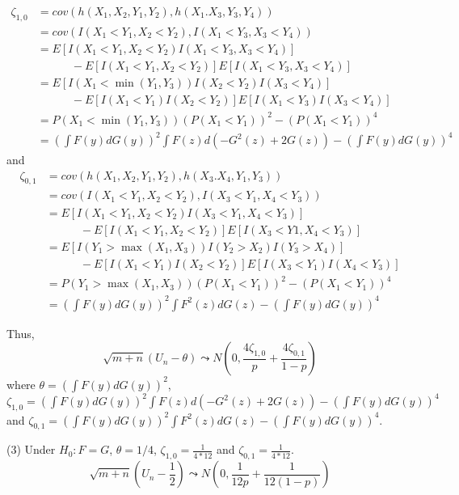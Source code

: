 \begin{solution}
\begin{equation*}
    \begin{split}
        \zeta_{1,0} & = cov(h(X_1, X_2, Y_1, Y_2), h(X_1. X_3, Y_3, Y_4)) \\
        & = cov(I(X_1<Y_1, X_2<Y_2), I(X_1<Y_3, X_3<Y_4)) \\
        & = E[I(X_1<Y_1, X_2<Y_2)I(X_1<Y_3, X_3<Y_4)] \\ 
        & \quad \quad \quad - E[I(X_1<Y_1, X_2<Y_2)] E[I(X_1<Y_3, X_3<Y_4)] \\
        & = E[I(X_1< \min(Y_1, Y_3)) I(X_2<Y_2) I(X_3 < Y_4) ] \\
        & \quad \quad \quad - E[I(X_1<Y_1) I(X_2<Y_2)] E[I(X_1<Y_3) I(X_3<Y_4)] \\
        & = P(X_1< \min(Y_1, Y_3))(P(X_1<Y_1))^2 - (P(X_1<Y_1))^4  \\
        & = \left(\int F(y) d G(y) \right)^2 \int F(z) d(-G^2(z)+2G(z)) - \left(\int F(y) d G(y) \right)^4
    \end{split}
\end{equation*}
and 
\begin{equation*}
    \begin{split}
        \zeta_{0,1} & = cov(h(X_1, X_2, Y_1, Y_2), h(X_3. X_4, Y_1, Y_3)) \\
        & = cov(I(X_1<Y_1, X_2<Y_2), I(X_3<Y_1, X_4<Y_3)) \\
        & = E[I(X_1<Y_1, X_2<Y_2)I(X_3<Y_1, X_4<Y_3)] \\ 
        & \quad \quad \quad - E[I(X_1<Y_1, X_2<Y_2)] E[I(X_3<Y1, X_4<Y_3)] \\
        & = E[I(Y_1 > \max(X_1, X_3)) I(Y_2 > X_2) I(Y_3 > X_4)] \\
        & \quad \quad \quad - E[I(X_1<Y_1) I(X_2<Y_2)] E[I(X_3<Y_1) I(X_4<Y_3)] \\
        & = P(Y_1 > \max(X_1, X_3))(P(X_1<Y_1))^2 - (P(X_1<Y_1))^4  \\
        & = \left(\int F(y) d G(y) \right)^2 \int F^2(z) dG(z) - \left(\int F(y) d G(y) \right)^4
    \end{split}
\end{equation*}

Thus,
\begin{equation*}
    \sqrt{m+n}(U_n-\theta) \leadsto N \left(0, \frac{4\zeta_{1,0}}{p}+\frac{4\zeta_{0,1}}{1-p} \right)
\end{equation*}
where $\theta=\left(\int F(y) d G(y) \right)^2$, $\zeta_{1,0}=\left(\int F(y) d G(y) \right)^2 \int F(z) d(-G^2(z)+2G(z)) - \left(\int F(y) d G(y) \right)^4$ and $\zeta_{0,1}=\left(\int F(y) d G(y) \right)^2 \int F^2(z) dG(z) - \left(\int F(y) d G(y) \right)^4$.


(3) Under $H_0: F=G$, $\theta=1/4$, $\zeta_{1,0}=\frac{1}{4*12}$ and $\zeta_{0,1}=\frac{1}{4*12}$.
\begin{equation*}
    \sqrt{m+n} \left(U_n-\frac{1}{2} \right) \leadsto N \left(0, \frac{1}{12p}+\frac{1}{12(1-p)} \right)
\end{equation*}
\end{solution}




